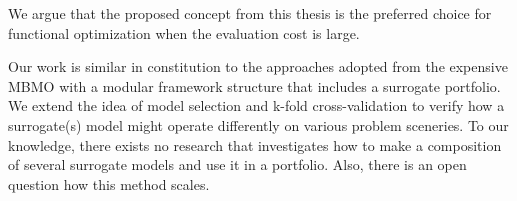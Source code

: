        We argue that the proposed concept from this thesis is the preferred choice for functional optimization when the evaluation cost is large.


        Our work is similar in constitution to the approaches adopted from the expensive MBMO \cite{SoftSurvey} with a modular framework structure that includes a surrogate portfolio. We extend the idea of model selection and k-fold cross-validation to verify how a surrogate(s) model might operate differently on various problem sceneries. To our knowledge, there exists no research that investigates how to make a composition of several surrogate models and use it in a portfolio. Also, there is an open question how this method scales.










